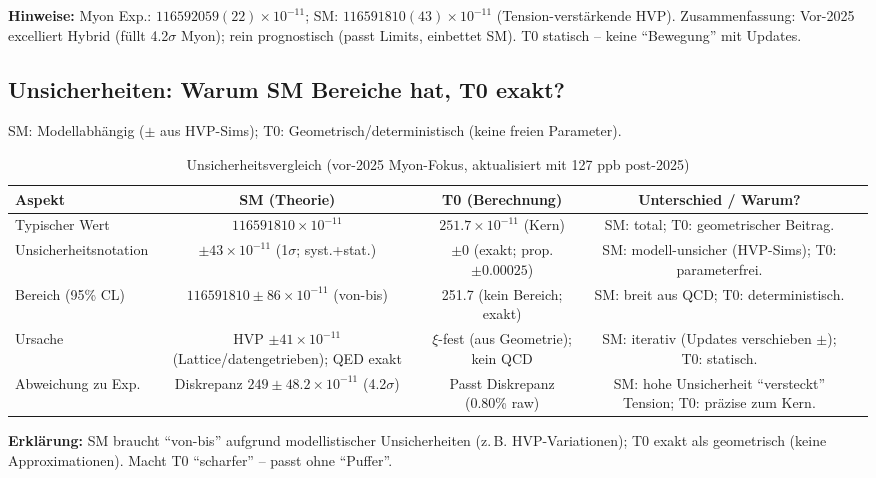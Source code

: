 \documentclass[12pt,a4paper]{article}
\begin{document}
	\textbf{Hinweise:} Myon Exp.: $116592059(22) \times 10^{-11}$; SM: $116591810(43) \times 10^{-11}$ (Tension-verstärkende HVP). Zusammenfassung: Vor-2025 excelliert Hybrid (füllt 4.2$\sigma$ Myon); rein prognostisch (passt Limits, einbettet SM). T0 statisch -- keine ``Bewegung'' mit Updates.
	
	\subsection{Unsicherheiten: Warum SM Bereiche hat, T0 exakt?}
	
	SM: Modellabhängig ($\pm$ aus HVP-Sims); T0: Geometrisch/deterministisch (keine freien Parameter).
	
	\begin{table}[ht!]
		\centering
		\small
		\begin{adjustbox}{max width=\textwidth}
			\begin{tabular}{lcccr}
				\toprule
				Aspekt & SM (Theorie) & T0 (Berechnung) & Unterschied / Warum? \\
				\midrule
				Typischer Wert & $116591810 \times 10^{-11}$ & $251.7 \times 10^{-11}$ (Kern) & SM: total; T0: geometrischer Beitrag. \\
				Unsicherheitsnotation & $\pm 43 \times 10^{-11}$ (1$\sigma$; syst.+stat.) & $\pm 0$ (exakt; prop. $\pm 0.00025$) & SM: modell-unsicher (HVP-Sims); T0: parameterfrei. \\
				Bereich (95\% CL) & $116591810 \pm 86 \times 10^{-11}$ (von-bis) & 251.7 (kein Bereich; exakt) & SM: breit aus QCD; T0: deterministisch. \\
				Ursache & HVP $\pm 41 \times 10^{-11}$ (Lattice/datengetrieben); QED exakt & $\xi$-fest (aus Geometrie); kein QCD & SM: iterativ (Updates verschieben $\pm$); T0: statisch. \\
				Abweichung zu Exp. & Diskrepanz $249 \pm 48.2 \times 10^{-11}$ (4.2$\sigma$) & Passt Diskrepanz (0.80\% raw) & SM: hohe Unsicherheit ``versteckt'' Tension; T0: präzise zum Kern. \\
				\bottomrule
			\end{tabular}
		\end{adjustbox}
		\caption{Unsicherheitsvergleich (vor-2025 Myon-Fokus, aktualisiert mit 127 ppb post-2025)}
		\label{tab:uncertainties}
	\end{table}
	
	\textbf{Erklärung:} SM braucht ``von-bis'' aufgrund modellistischer Unsicherheiten (z.\,B. HVP-Variationen); T0 exakt als geometrisch (keine Approximationen). Macht T0 ``scharfer'' -- passt ohne ``Puffer''.
	
\end{document}
